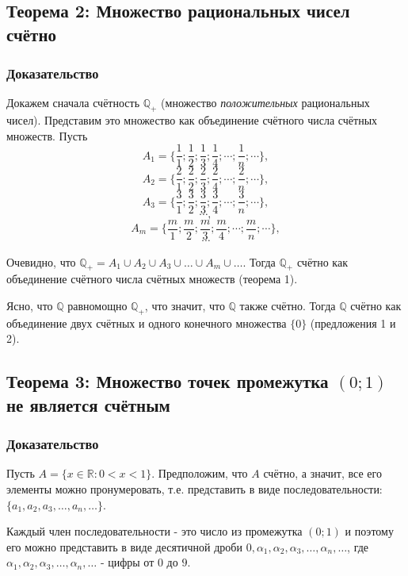 \documentclass{article}
\begin{document}
\subsection{Теорема 2: Множество рациональных чисел счётно}
\subsubsection*{Доказательство}

Докажем сначала счётность $\mathbb{Q}_+$ (множество \textit{положительных} рациональных чисел). Представим это множество как объединение счётного числа счётных множеств. Пусть \[
	A_1 = \{\frac{1}{1}; \frac{1}{2}; \frac{1}{3}; \frac{1}{4}; \cdots; \frac{1}{n}; \cdots\}, \]\[
	A_2 = \{\frac{2}{1}; \frac{2}{2}; \frac{2}{3}; \frac{2}{4}; \cdots; \frac{2}{n}; \cdots\}, \]\[
	A_3 = \{\frac{3}{1}; \frac{3}{2}; \frac{3}{3}; \frac{3}{4}; \cdots; \frac{3}{n}; \cdots\}, \]\[
	\cdots, \]\[
	A_m = \{\frac{m}{1}; \frac{m}{2}; \frac{m}{3}; \frac{m}{4}; \cdots; \frac{m}{n}; \cdots\}, \]\[
	\cdots
\]

Очевидно, что $\mathbb{Q}_+ = A_1 \cup A_2 \cup A_3 \cup \dots \cup A_m \cup \dots$. Тогда $\mathbb{Q}_+$ счётно как объединение счётного числа счётных множеств (теорема 1).

Ясно, что $\mathbb{Q}$ равномощно $\mathbb{Q}_+$, что значит, что $\mathbb{Q}$ также счётно. Тогда $\mathbb{Q}$ счётно как объединение двух счётных и одного конечного множества $\{0\}$ (предложения 1 и 2).

\subsection{Теорема 3: Множество точек промежутка $(0; 1)$ не является счётным}

\subsubsection*{Доказательство}

Пусть $A = \{x \in \mathbb{R} : 0 < x < 1\}$. Предположим, что $A$ счётно, а значит, все его элементы можно пронумеровать, т.е. представить в виде последовательности: $\{a_1, a_2, a_3, \dots, a_n, \dots\}$.

Каждый член последовательности - это число из промежутка $(0; 1)$ и поэтому его можно представить в виде десятичной дроби $0, \alpha_1, \alpha_2, \alpha_3, \dots, \alpha_n, \dots$, где $\alpha_1, \alpha_2, \alpha_3, \dots, \alpha_n, \dots$ - цифры от $0$ до $9$.
\end{document}
